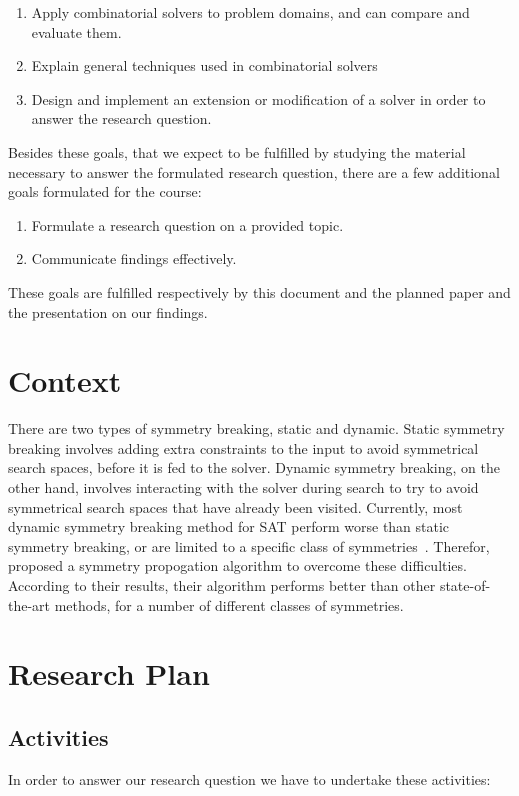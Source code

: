 			\begin{enumerate}
				\item
					Apply combinatorial solvers to problem domains, and can compare and evaluate them.
				\item
					Explain general techniques used in combinatorial solvers
				\item
					Design and implement an extension or modification of a solver in order to answer the research question.
			\end{enumerate}

			Besides these goals, that we expect to be fulfilled by studying the material necessary to answer the formulated research question, there are a few additional goals formulated for the course:

			\begin{enumerate}
				\item Formulate a research question on a provided topic.
				\item Communicate findings effectively.
			\end{enumerate}

			These goals are fulfilled respectively by this document and the planned paper and the	presentation on our findings.

	\section{Context}
	There are two types of symmetry breaking, static and dynamic. Static symmetry breaking involves adding extra constraints to the input to avoid symmetrical search spaces, before it is fed to the solver. Dynamic symmetry breaking, on the other hand, involves interacting with the solver during search to try to avoid symmetrical search spaces that have already been visited.
	Currently, most dynamic symmetry breaking method for SAT perform worse than static symmetry breaking, or are limited to a specific class of symmetries~\cite{devriendt2012symmetry}. Therefor,~\cite{devriendt2012symmetry} proposed a symmetry propogation algorithm to overcome these difficulties. According to their results, their algorithm performs better than other state-of-the-art methods, for a number of different classes of symmetries.

	\section{Research Plan}

		\subsection{Activities}
			In order to answer our research question we have to undertake these activities:
	
